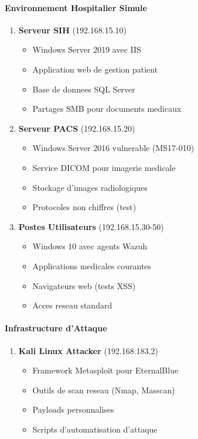 \paragraph{Environnement Hospitalier Simule}
\begin{enumerate}
  \item \textbf{Serveur SIH} (192.168.15.10)
        \begin{itemize}
          \item Windows Server 2019 avec IIS
          \item Application web de gestion patient
          \item Base de donnees SQL Server
          \item Partages SMB pour documents medicaux
        \end{itemize}

  \item \textbf{Serveur PACS} (192.168.15.20)
        \begin{itemize}
          \item Windows Server 2016 vulnerable (MS17-010)
          \item Service DICOM pour imagerie medicale
          \item Stockage d'images radiologiques
          \item Protocoles non chiffres (test)
        \end{itemize}

  \item \textbf{Postes Utilisateurs} (192.168.15.30-50)
        \begin{itemize}
          \item Windows 10 avec agents Wazuh
          \item Applications medicales courantes
          \item Navigateurs web (tests XSS)
          \item Acces reseau standard
        \end{itemize}
\end{enumerate}

\paragraph{Infrastructure d'Attaque}
\begin{enumerate}
  \item \textbf{Kali Linux Attacker} (192.168.183.2)
        \begin{itemize}
          \item Framework Metasploit pour EternalBlue
          \item Outils de scan reseau (Nmap, Masscan)
          \item Payloads personnalises
          \item Scripts d'automatisation d'attaque
        \end{itemize}

\end{enumerate}


